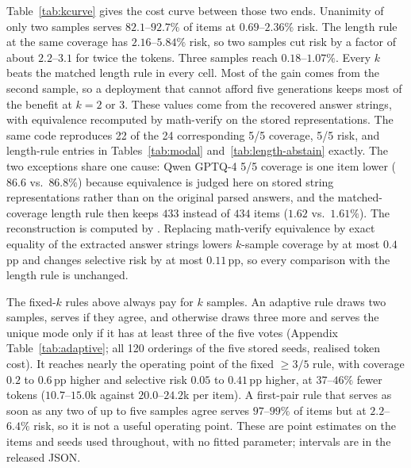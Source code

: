 \documentclass[11pt,a4paper]{article}
\begin{document}
Table~\ref{tab:kcurve} gives the cost curve between those two ends. Unanimity of only two samples serves $82.1$--$92.7\%$ of items at $0.69$--$2.36\%$ risk. The length rule at the same coverage has $2.16$--$5.84\%$ risk, so two samples cut risk by a factor of about $2.2$--$3.1$ for twice the tokens. Three samples reach $0.18$--$1.07\%$. Every $k$ beats the matched length rule in every cell. Most of the gain comes from the second sample, so a deployment that cannot afford five generations keeps most of the benefit at $k=2$ or $3$. These values come from the recovered answer strings, with equivalence recomputed by math-verify on the stored representations. The same code reproduces 22 of the 24 corresponding 5/5 coverage, 5/5 risk, and length-rule entries in Tables~\ref{tab:modal} and~\ref{tab:length-abstain} exactly. The two exceptions share one cause: Qwen GPTQ-4 5/5 coverage is one item lower ($86.6$ vs.\ $86.8\%$) because equivalence is judged here on stored string representations rather than on the original parsed answers, and the matched-coverage length rule then keeps $433$ instead of $434$ items ($1.62$ vs.\ $1.61\%$). The reconstruction is computed by . Replacing math-verify equivalence by exact equality of the extracted answer strings lowers $k$-sample coverage by at most $0.4$\,pp and changes selective risk by at most $0.11$\,pp, so every comparison with the length rule is unchanged.

The fixed-$k$ rules above always pay for $k$ samples. An adaptive rule draws two samples, serves if they agree, and otherwise draws three more and serves the unique mode only if it has at least three of the five votes (Appendix Table~\ref{tab:adaptive}; all 120 orderings of the five stored seeds, realised token cost). It reaches nearly the operating point of the fixed $\ge 3/5$ rule, with coverage $0.2$ to $0.6$\,pp higher and selective risk $0.05$ to $0.41$\,pp higher, at $37$--$46\%$ fewer tokens ($10.7$--$15.0$k against $20.0$--$24.2$k per item). A first-pair rule that serves as soon as any two of up to five samples agree serves $97$--$99\%$ of items but at $2.2$--$6.4\%$ risk, so it is not a useful operating point. These are point estimates on the items and seeds used throughout, with no fitted parameter; intervals are in the released JSON.
\end{document}
